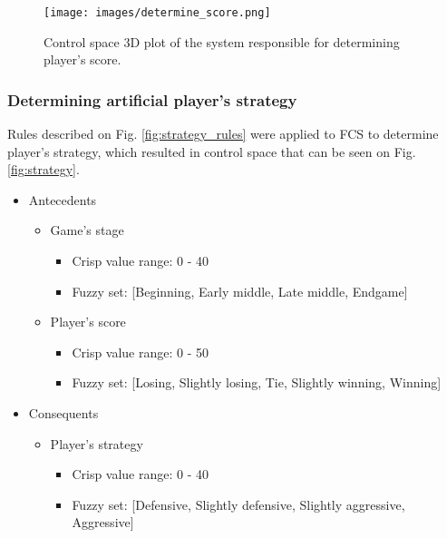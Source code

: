 \documentclass{article}
\begin{document}
\begin{figure}[tbhp]
  \centering
      \texttt{[image: images/determine\_score.png]}
  \caption{Control space 3D plot of the system responsible for determining player's score.}
  \label{fig:score}
\end{figure}

\subsubsection{Determining artificial player's strategy}

Rules described on Fig. \ref{fig:strategy_rules} were applied to FCS to determine player's strategy, which resulted in control space that can be seen on Fig. \ref{fig:strategy}.

\begin{itemize} 
\item Antecedents
     \begin{itemize} 
        \item Game's stage
            \begin{itemize}
                \item Crisp value range: 0 - 40
                \item Fuzzy set: [Beginning, Early middle, Late middle, Endgame]
            \end{itemize}
        \item Player's score
            \begin{itemize}
                \item Crisp value range: 0 - 50
                \item Fuzzy set: [Losing, Slightly losing, Tie, Slightly winning, Winning]
            \end{itemize}
     \end{itemize}
\item Consequents
     \begin{itemize} 
        \item Player's strategy
            \begin{itemize}
                \item Crisp value range: 0 - 40
                \item Fuzzy set: [Defensive, Slightly defensive, Slightly aggressive, Aggressive]
            \end{itemize}
     \end{itemize}
\end{itemize}
\end{document}
